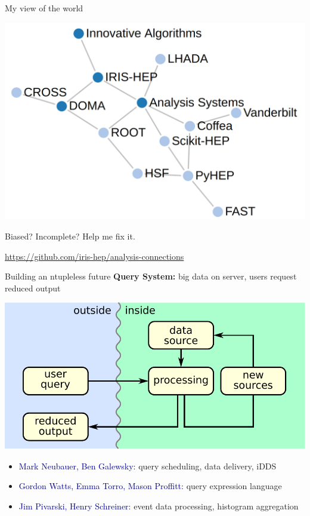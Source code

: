 \documentclass[aspectratio=169]{beamer}
\begin{document}
\begin{frame}{My view of the world}
\vspace{0.25 cm}
\begin{center}
\includegraphics[width=0.8\linewidth]{analysis-connections-cross.png}
\end{center}

\scriptsize
\vspace{-2.5\baselineskip}
Biased? Incomplete? Help me fix it.

\textcolor{blue}{\url{https://github.com/iris-hep/analysis-connections}}
\end{frame}

\begin{frame}{Building an ntupleless future}
\vspace{0.5 cm}
\Large {\bf Query System:} big data on server, users request reduced output
\begin{center}
\includegraphics[width=0.6\linewidth]{basic-block-diagram.pdf}
\end{center}

\normalsize
\begin{itemize}
\item \textcolor{darkblue}{Mark Neubauer, Ben Galewsky:} query scheduling, data delivery, iDDS
\item \textcolor{darkblue}{Gordon Watts, Emma Torro, Mason Proffitt:} query expression language
\item \textcolor{darkblue}{Jim Pivarski, Henry Schreiner:} event data processing, histogram aggregation
\end{itemize}
\end{frame}
\end{document}
